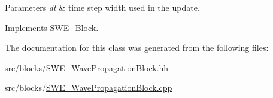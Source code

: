 \begin{DoxyParams}{Parameters}
{\em dt} & time step width used in the update. \\
\hline
\end{DoxyParams}


Implements \hyperlink{classSWE__Block_ab2b4b659f23d5d45413dece8d2da3298}{S\-W\-E\-\_\-\-Block}.



The documentation for this class was generated from the following files\-:\begin{DoxyCompactItemize}
\item 
src/blocks/\hyperlink{SWE__WavePropagationBlock_8hh}{S\-W\-E\-\_\-\-Wave\-Propagation\-Block.\-hh}\item 
src/blocks/\hyperlink{SWE__WavePropagationBlock_8cpp}{S\-W\-E\-\_\-\-Wave\-Propagation\-Block.\-cpp}\end{DoxyCompactItemize}
